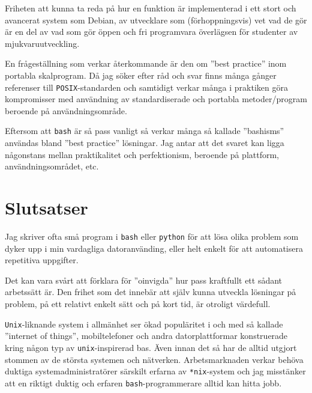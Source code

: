 Friheten att kunna ta reda på hur en funktion är implementerad i ett stort och
avancerat system som Debian, av utvecklare som (förhoppningsvis) vet vad de gör
är en del av vad som gör öppen och fri programvara överlägsen för studenter av
mjukvaruutveckling.

En frågeställning som verkar återkommande är den om ''best practice'' inom
portabla skalprogram. Då jag söker efter råd och svar finns många gånger
referenser till \texttt{POSIX}-standarden \cite{IEEE:2001:ISRa,
IEEE:2001:ISRb, IEEE:2001:ISRc, IEEE:2001:ISRd} och samtidigt
verkar många i praktiken göra kompromisser med användning av standardiserade
och portabla metoder/program beroende på användningsområde.

Eftersom att \texttt{bash} är så pass vanligt så verkar många så kallade
''bashisms'' \cite{misc:bashism} användas bland ''best practice'' lösningar.
Jag antar att det svaret kan ligga någonstans mellan praktikalitet och
perfektionism, beroende på plattform, användningsområdet, etc.


\section{Slutsatser}
Jag skriver ofta små program i \texttt{bash} eller \texttt{python} för att lösa
olika problem som dyker upp i min vardagliga datoranvänding, eller helt enkelt
för att automatisera repetitiva uppgifter. 

Det kan vara svårt att förklara för ''oinvigda'' hur pass kraftfullt ett sådant
arbetssätt är.  Den frihet som det innebär att själv kunna utveckla lösningar
på problem, på ett relativt enkelt sätt och på kort tid, är otroligt värdefull. 

\texttt{Unix}-liknande system i allmänhet ser ökad populäritet i och med så
kallade ''internet of things'', mobiltelefoner och andra datorplattformar
konstruerade kring någon typ av \texttt{unix}-inspirerad bas. Även innan det så
har de alltid utgjort stommen av de största systemen och nätverken.
Arbetsmarknaden verkar behöva duktiga systemadministratörer särskilt erfarna av
\texttt{*nix}-system och jag misstänker att en riktigt duktig och erfaren
\texttt{bash}-programmerare alltid kan hitta jobb.
